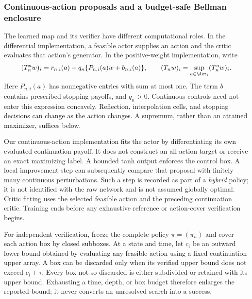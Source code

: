 \subsubsection{Continuous-action proposals and a budget-safe Bellman enclosure}\label{sec:r8-operator}
The learned map and its verifier have different computational roles. In the differential implementation, a feasible actor supplies an action and the critic evaluates that action's generator. In the positive-weight implementation, write
\begin{equation}\label{eq:r8-positive}
 (T_n^a w)_i=r_{n,i}(a)+q_n\{P_{n,i}(a)w+b_{n,i}(a)\},
 \qquad (T_nw)_i=\sup_{a\in\Act_i}(T_n^aw)_i .
\end{equation}
Here $P_{n,i}(a)$ has nonnegative entries with sum at most one. The term $b$ contains prescribed stopping payoffs, and $q_n>0$. Continuous controls need not enter this expression concavely. Reflection, interpolation cells, and stopping decisions can change as the action changes. A supremum, rather than an attained maximizer, suffices below.

Our continuous-action implementation fits the actor by differentiating its own evaluated continuation payoff. It does not construct an all-action target or receive an exact maximizing label. A bounded tanh output enforces the control box. A local improvement step can subsequently compare that proposal with finitely many continuous perturbations. Such a step is recorded as part of a \emph{hybrid} policy; it is not identified with the raw network and is not assumed globally optimal. Critic fitting uses the selected feasible action and the preceding continuation critic. Training ends before any exhaustive reference or action-cover verification begins.

For independent verification, freeze the complete policy $\pi=(\pi_n)$ and cover each action box by closed subboxes. At a state and time, let $c_i$ be an outward lower bound obtained by evaluating any feasible action using a fixed continuation upper array. A box can be discarded only when its verified upper bound does not exceed $c_i+\tau$. Every box not so discarded is either subdivided or retained with its upper bound. Exhausting a time, depth, or box budget therefore enlarges the reported bound; it never converts an unresolved search into a success.

